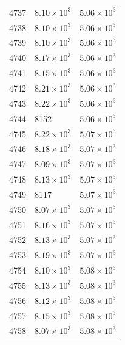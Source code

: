 \begin{table}[H]
\begin{tabular}{lll}
4737 & $\displaystyle 8.10 \times 10^{3}$ & $\displaystyle 5.06 \times 10^{3}$ \\
4738 & $\displaystyle 8.10 \times 10^{3}$ & $\displaystyle 5.06 \times 10^{3}$ \\
4739 & $\displaystyle 8.10 \times 10^{3}$ & $\displaystyle 5.06 \times 10^{3}$ \\
4740 & $\displaystyle 8.17 \times 10^{3}$ & $\displaystyle 5.06 \times 10^{3}$ \\
4741 & $\displaystyle 8.15 \times 10^{3}$ & $\displaystyle 5.06 \times 10^{3}$ \\
4742 & $\displaystyle 8.21 \times 10^{3}$ & $\displaystyle 5.06 \times 10^{3}$ \\
4743 & $\displaystyle 8.22 \times 10^{3}$ & $\displaystyle 5.06 \times 10^{3}$ \\
4744 & 8152 & $\displaystyle 5.06 \times 10^{3}$ \\
4745 & $\displaystyle 8.22 \times 10^{3}$ & $\displaystyle 5.07 \times 10^{3}$ \\
4746 & $\displaystyle 8.18 \times 10^{3}$ & $\displaystyle 5.07 \times 10^{3}$ \\
4747 & $\displaystyle 8.09 \times 10^{3}$ & $\displaystyle 5.07 \times 10^{3}$ \\
4748 & $\displaystyle 8.13 \times 10^{3}$ & $\displaystyle 5.07 \times 10^{3}$ \\
4749 & 8117 & $\displaystyle 5.07 \times 10^{3}$ \\
4750 & $\displaystyle 8.07 \times 10^{3}$ & $\displaystyle 5.07 \times 10^{3}$ \\
4751 & $\displaystyle 8.16 \times 10^{3}$ & $\displaystyle 5.07 \times 10^{3}$ \\
4752 & $\displaystyle 8.13 \times 10^{3}$ & $\displaystyle 5.07 \times 10^{3}$ \\
4753 & $\displaystyle 8.19 \times 10^{3}$ & $\displaystyle 5.07 \times 10^{3}$ \\
4754 & $\displaystyle 8.10 \times 10^{3}$ & $\displaystyle 5.08 \times 10^{3}$ \\
4755 & $\displaystyle 8.13 \times 10^{3}$ & $\displaystyle 5.08 \times 10^{3}$ \\
4756 & $\displaystyle 8.12 \times 10^{3}$ & $\displaystyle 5.08 \times 10^{3}$ \\
4757 & $\displaystyle 8.15 \times 10^{3}$ & $\displaystyle 5.08 \times 10^{3}$ \\
4758 & $\displaystyle 8.07 \times 10^{3}$ & $\displaystyle 5.08 \times 10^{3}$ \\

\end{tabular}
\end{table}
